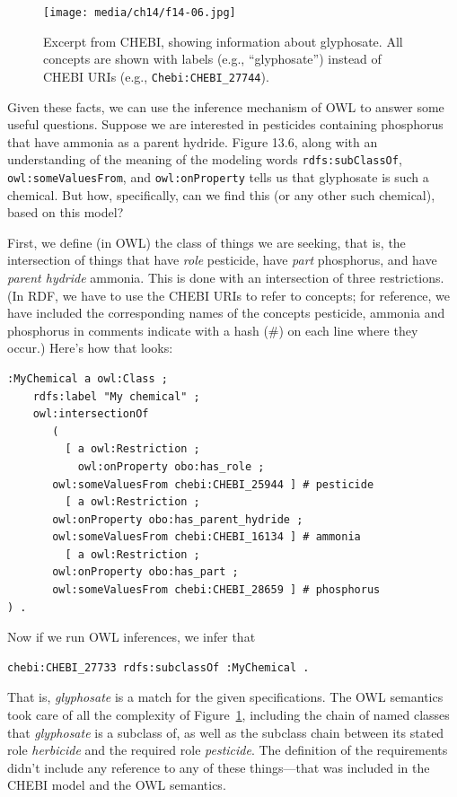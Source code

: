 \begin{figure}
\centering
\texttt{[image: media/ch14/f14-06.jpg]}
\caption{Excerpt from CHEBI, showing information about glyphosate. All concepts
are shown with labels (e.g., ``glyphosate'') instead of CHEBI URIs
(e.g., \texttt{Chebi:CHEBI\_27744}).
}
\label{fig:ch14.06}
\end{figure}

Given these facts, we can use the inference mechanism of OWL to answer
some useful questions. Suppose we are interested in pesticides
containing phosphorus that have ammonia as a parent hydride. Figure
13.6, along with an understanding of the meaning of the modeling words
\texttt{rdfs:subClassOf}, \texttt{owl:someValuesFrom}, and \texttt{owl:onProperty} tells us that
glyphosate is such a chemical. But how, specifically, can we find this
(or any other such chemical), based on this model?

First, we define (in OWL) the class of things we are seeking, that is,
the intersection of things that have \textit{role} pesticide, have \textit{part}
phosphorus, and have \textit{parent hydride} ammonia. This is done with an
intersection of three restrictions. (In RDF, we have to use the CHEBI
URIs to refer to concepts; for reference, we have included the
corresponding names of the concepts pesticide, ammonia and
phosphorus in comments indicate with a hash (\#) on each line where they
occur.) Here's how that looks:

\begin{lstlisting}
:MyChemical a owl:Class ;
    rdfs:label "My chemical" ;
    owl:intersectionOf
       (
         [ a owl:Restriction ;
           owl:onProperty obo:has_role ;
	   owl:someValuesFrom chebi:CHEBI_25944 ] # pesticide
         [ a owl:Restriction ;
	   owl:onProperty obo:has_parent_hydride ;
	   owl:someValuesFrom chebi:CHEBI_16134 ] # ammonia
         [ a owl:Restriction ;
	   owl:onProperty obo:has_part ;
	   owl:someValuesFrom chebi:CHEBI_28659 ] # phosphorus
) .
\end{lstlisting}

Now if we run OWL inferences, we infer that

\begin{lstlisting}
chebi:CHEBI_27733 rdfs:subclassOf :MyChemical .
\end{lstlisting}

That is, \textit{glyphosate} is a match for the given specifications. The OWL
semantics took care of all the complexity of Figure~\ref{fig:ch14.06}, including the
chain of named classes that \textit{glyphosate} is a subclass of, as well as the
subclass chain between its stated role \textit{herbicide} and the required role
\textit{pesticide}. The definition of the requirements didn't include any
reference to any of these things---that was included in the CHEBI model
and the OWL semantics.


